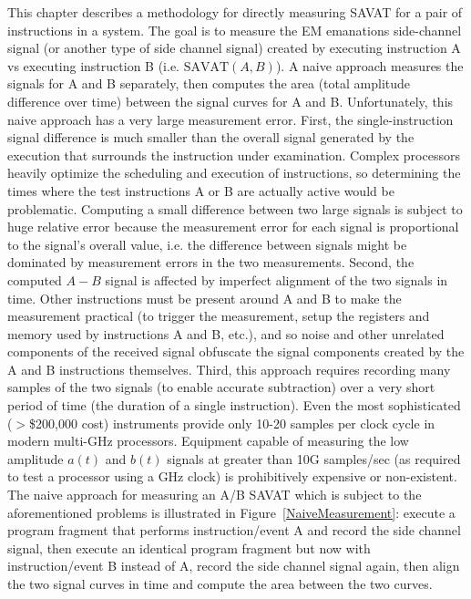 This chapter describes a methodology for directly measuring SAVAT for a pair of instructions in a system. The goal is to measure the EM emanations side-channel signal (or another type of side channel signal) created by executing instruction A vs executing instruction B (i.e. $\textrm{SAVAT}(A,B)$). A naive approach measures the signals for A and B separately, then computes the area (total amplitude difference over time) between the signal curves for A and B. Unfortunately, this naive approach has a very large measurement error. First, the single-instruction signal difference is much smaller than the overall signal generated by the execution that surrounds the instruction under examination. Complex processors heavily optimize the scheduling and execution of instructions, so determining the times where the test instructions A or B are actually active would be problematic.
Computing a small difference between two large signals is subject to huge relative error because the measurement error for each signal is proportional to the signal's overall value, i.e. the difference between signals might be dominated by measurement errors in the two measurements. Second, the computed $A - B$ signal is affected by imperfect alignment of the two signals in time. Other instructions must be present around A and B to make the measurement practical (to trigger the measurement, setup the registers and memory used by instructions A and B, etc.), and so noise and other unrelated components of the received signal obfuscate the signal components created by the A and B instructions themselves. Third, this approach requires recording many samples of the two signals (to enable accurate subtraction) over a very short period of time (the duration of a single instruction). Even the most sophisticated ($>$\$200,000 cost) instruments provide only 10-20 samples per clock cycle in modern multi-GHz processors. Equipment capable of measuring the low amplitude $a(t)$ and $b(t)$ signals at greater than 10G samples/sec (as required to test a processor using a GHz clock) is prohibitively expensive or non-existent. The naive approach for measuring an A/B SAVAT which is subject to the aforementioned problems is illustrated in Figure~\ref{NaiveMeasurement}: execute a program fragment that performs instruction/event A and record the side channel signal, then execute an identical program fragment but now with instruction/event B instead of A, record the side channel signal again, then align the two signal curves in time and compute the area between the two curves.

